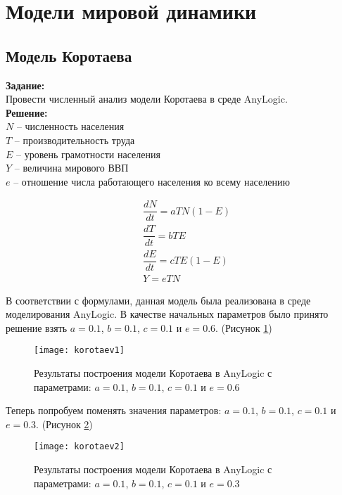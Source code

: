 \section*{Модели мировой динамики}
\subsection*{Модель Коротаева}

\textbf{Задание:}\\
Провести численный анализ модели Коротаева в среде AnyLogic.\\

\textbf{Решение:}\\
$N$ -- численность населения\\
$T$ -- производительность труда\\
$E$ -- уровень грамотности населения\\
$Y$ -- величина мирового ВВП\\
$e$ -- отношение числа работающего населения ко всему населению

\begin{align*}
& \dfrac{dN}{dt} = aTN(1 - E)\\
& \dfrac{dT}{dt} = bTE\\
& \dfrac{dE}{dt} = cTE(1 - E)\\
& Y = eTN
\end{align*}

В соответствии с формулами, данная модель была реализована в среде моделирования AnyLogic. В качестве начальных параметров было принято решение взять $a = 0.1$, $b = 0.1$, $c = 0.1$ и $e = 0.6$. (Рисунок \ref{fig:korotaev1})
\begin{figure}[h]
	\centering \texttt{[image: korotaev1]}
	\caption{Результаты построения модели Коротаева в AnyLogic с параметрами: $a = 0.1$, $b = 0.1$, $c = 0.1$ и $e = 0.6$}
	\label{fig:korotaev1}
\end{figure}

\newpage

Теперь попробуем поменять значения параметров: $a = 0.1$, $b = 0.1$, $c = 0.1$ и $e = 0.3$. (Рисунок \ref{fig:korotaev2})
\begin{figure}[h]
	\centering \texttt{[image: korotaev2]}
	\caption{Результаты построения модели Коротаева в AnyLogic с параметрами: $a = 0.1$, $b = 0.1$, $c = 0.1$ и $e = 0.3$}
	\label{fig:korotaev2}
\end{figure}

